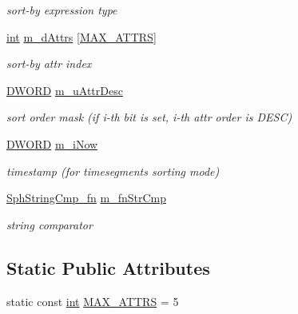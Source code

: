 \begin{DoxyCompactItemize}
\begin{DoxyCompactList}\small\item\em sort-\/by expression type \end{DoxyCompactList}\item 
\hyperlink{sphinxexpr_8cpp_a4a26e8f9cb8b736e0c4cbf4d16de985e}{int} \hyperlink{structCSphMatchComparatorState_a8e6ddbb77c93545f458d72a03f0d139c}{m\-\_\-d\-Attrs} \mbox{[}\hyperlink{structCSphMatchComparatorState_a2537521712fc482d4d5a06cb24e27995}{M\-A\-X\-\_\-\-A\-T\-T\-R\-S}\mbox{]}
\begin{DoxyCompactList}\small\item\em sort-\/by attr index \end{DoxyCompactList}\item 
\hyperlink{sphinxstd_8h_a798af1e30bc65f319c1a246cecf59e39}{D\-W\-O\-R\-D} \hyperlink{structCSphMatchComparatorState_a018723ab4c662b84dd54155a71a529b9}{m\-\_\-u\-Attr\-Desc}
\begin{DoxyCompactList}\small\item\em sort order mask (if i-\/th bit is set, i-\/th attr order is D\-E\-S\-C) \end{DoxyCompactList}\item 
\hyperlink{sphinxstd_8h_a798af1e30bc65f319c1a246cecf59e39}{D\-W\-O\-R\-D} \hyperlink{structCSphMatchComparatorState_af698740294b9f825f6042c0feca4b54a}{m\-\_\-i\-Now}
\begin{DoxyCompactList}\small\item\em timestamp (for timesegments sorting mode) \end{DoxyCompactList}\item 
\hyperlink{sphinx_8h_a564bff07e446e0e31a63004937e8347b}{Sph\-String\-Cmp\-\_\-fn} \hyperlink{structCSphMatchComparatorState_a3b25365c56f4cba770d2e70be01a2a03}{m\-\_\-fn\-Str\-Cmp}
\begin{DoxyCompactList}\small\item\em string comparator \end{DoxyCompactList}\end{DoxyCompactItemize}
\subsection*{Static Public Attributes}
\begin{DoxyCompactItemize}
\item 
static const \hyperlink{sphinxexpr_8cpp_a4a26e8f9cb8b736e0c4cbf4d16de985e}{int} \hyperlink{structCSphMatchComparatorState_a2537521712fc482d4d5a06cb24e27995}{M\-A\-X\-\_\-\-A\-T\-T\-R\-S} = 5
\end{DoxyCompactItemize}



